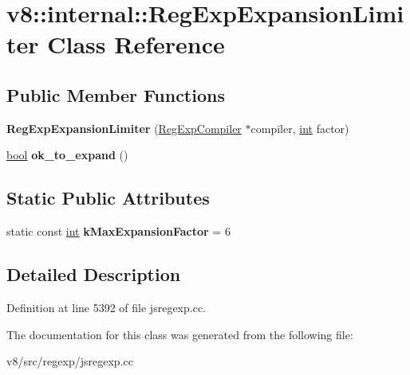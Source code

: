\hypertarget{classv8_1_1internal_1_1RegExpExpansionLimiter}{}\section{v8\+:\+:internal\+:\+:Reg\+Exp\+Expansion\+Limiter Class Reference}
\label{classv8_1_1internal_1_1RegExpExpansionLimiter}
\subsection*{Public Member Functions}
\begin{DoxyCompactItemize}
\item 
\mbox{\label{classv8_1_1internal_1_1RegExpExpansionLimiter_a48f9e2f2adff3a1ed31337230f1fd599}} 
{\bfseries Reg\+Exp\+Expansion\+Limiter} (\mbox{\hyperlink{classv8_1_1internal_1_1RegExpCompiler}{Reg\+Exp\+Compiler}} $\ast$compiler, \mbox{\hyperlink{classint}{int}} factor)
\item 
\mbox{\label{classv8_1_1internal_1_1RegExpExpansionLimiter_a06bcd44dbe9806935f1c4acfd25ef07e}} 
\mbox{\hyperlink{classbool}{bool}} {\bfseries ok\+\_\+to\+\_\+expand} ()
\end{DoxyCompactItemize}
\subsection*{Static Public Attributes}
\begin{DoxyCompactItemize}
\item 
\mbox{\label{classv8_1_1internal_1_1RegExpExpansionLimiter_a8c34bb2b6e52fc4be6f4a544643f47c6}} 
static const \mbox{\hyperlink{classint}{int}} {\bfseries k\+Max\+Expansion\+Factor} = 6
\end{DoxyCompactItemize}


\subsection{Detailed Description}


Definition at line 5392 of file jsregexp.\+cc.



The documentation for this class was generated from the following file\+:\begin{DoxyCompactItemize}
\item 
v8/src/regexp/jsregexp.\+cc\end{DoxyCompactItemize}
